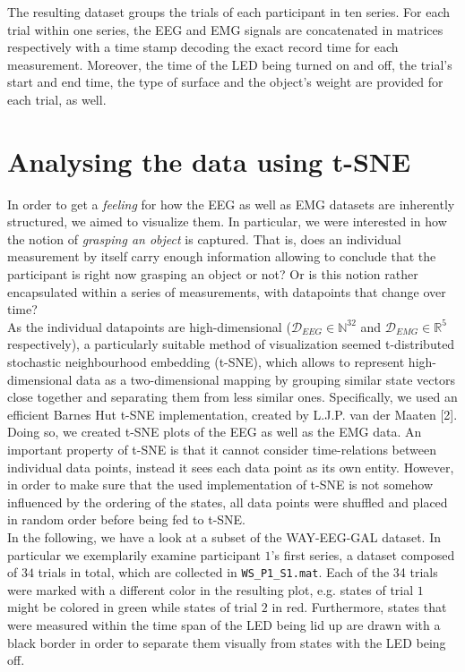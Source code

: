 \documentclass{article} %
\begin{document}
The resulting dataset groups the trials of each participant in ten series. For each trial within one series, the EEG and EMG signals are concatenated in matrices respectively with a time stamp decoding the exact record time for each measurement. Moreover, the time of the LED being turned on and off, the trial's start and end time, the type of surface and the object's weight are provided for each trial, as well. \cite{nature}




\section{Analysing the data using t-SNE}\label{sec:tsne}
In order to get a \emph{feeling} for how the EEG as well as EMG datasets are inherently structured, we aimed to visualize them. In particular, we were interested in how the notion of \emph{grasping an object} is captured. That is, does an individual measurement by itself carry enough information allowing to conclude that the participant is right now grasping an object or not? Or is this notion rather encapsulated within a series of measurements, with datapoints that change over time?\\
As the individual datapoints are high-dimensional ($\mathcal{D}_{EEG} \in \mathbb{N}^{32}$ and $\mathcal{D}_{EMG} \in \mathbb{R}^5$ respectively), a particularly suitable method of visualization seemed t-distributed stochastic neighbourhood embedding (t-SNE), which allows to represent high-dimensional data as a two-dimensional mapping by grouping similar state vectors close together and separating them from less similar ones. Specifically, we used an efficient Barnes Hut t-SNE implementation, created by L.J.P. van der Maaten [2]. Doing so, we created t-SNE plots of the EEG as well as the EMG data. An important property of t-SNE is that it cannot consider time-relations between individual data points, instead it sees each data point as its own entity. However, in order to make sure that the used implementation of t-SNE is not somehow influenced by the ordering of the states, all data points were shuffled and placed in random order before being fed to t-SNE.\\
In the following, we have a look at a subset of the WAY-EEG-GAL dataset. In particular we exemplarily examine participant $1$'s first series, a dataset composed of $34$ trials in total, which are collected in \verb|WS_P1_S1.mat|. Each of the 34 trials were marked with a different color in the resulting plot, e.g. states of trial $1$ might be colored in green while states of trial $2$ in red. Furthermore, states that were measured within the time span of the LED being lid up are drawn with a black border in order to separate them visually from states with the LED being off.\\
\end{document}
